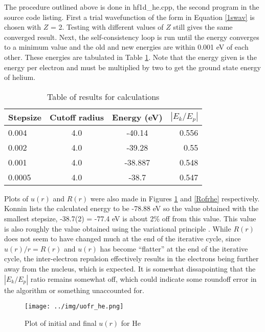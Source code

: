 \documentclass[11pt,letterpaper]{article}
\begin{document}
The procedure outlined above  
is done in hf1d\_he.cpp, the second program 
in the source code listing. First a trial wavefunction of the form in 
Equation \eqref{1swav} is chosen with $Z$ = 2. Testing with
different values of $Z$ still gives the same converged result. 
Next, the self-consistency loop is run until the energy converges to a minimum
value and the old and new energies are within 0.001 eV of each other. 
These energies are tabulated in Table \ref{etable}. Note that the energy
given is the energy per electron and must be multiplied by two to get the
ground state energy of helium.
\begin{table}[h!]
\begin{tabular}[h!]{| l | c | c | r | }
  \hline
  Stepsize & Cutoff radius & Energy (eV) & $|E_k/E_p|$ \\
  \hline
  0.004 & 4.0 & -40.14  & 0.556 \\
  0.002 & 4.0 & -39.28  & 0.55 \\
  0.001 & 4.0 & -38.887 & 0.548 \\
  0.0005 & 4.0 & -38.7 & 0.547 \\
  \hline
\end{tabular}
\caption{\label{etable}
Table of results for calculations}
\end{table}

Plots of $u(r)$ and $R(r)$ were also made in Figures \ref{uofrhe} and
\ref{Rofrhe} respectively. Konnin lists the calculated energy to be 
-78.88 eV so the value obtained with the smallest stepsize, -38.7(2) = -77.4 eV
is about 2\% off from this value. This value is also roughly the value obtained
using the variational principle \cite[p.~314-315]{griffiths05}. 
While $R(r)$ does not seem to have 
changed much at the end of the iterative cycle, since $u(r)/r = R(r)$ and
$u(r)$ has become ``flatter'' at the end of the iterative cycle, the
inter-electron repulsion effectively results in the electrons being further
away from the nucleus, which is expected. It is somewhat dissapointing that
the $|E_k/E_p|$ ratio remains somewhat off, which could indicate some roundoff
error in the algorithm or something unaccounted for.

\begin{figure}[h!]
\begin{center}
\texttt{[image: ../img/uofr\_he.png]}
\end{center}
\caption{Plot of initial and final $u(r)$ for He
\label{uofrhe}}
\end{figure}
\end{document}
